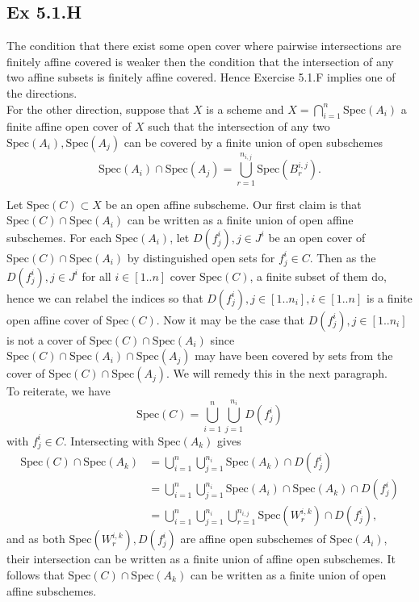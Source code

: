 \documentclass{article}
\theoremstyle{definition}
\newcommand{\Spec}{\text{Spec}}
\begin{document}
\subsection*{Ex 5.1.H}

The condition that there exist some open cover where pairwise intersections are
finitely affine covered is weaker then the condition that the intersection of
any two affine subsets is finitely affine covered. Hence Exercise 5.1.F implies
one of the directions. \\

For the other direction, suppose that $X$ is a scheme and $X = \bigcap_{i =
1}^{n} \Spec(A_i)$ a finite affine open cover of $X$ such that the intersection
of any two $\Spec(A_i), \Spec(A_j)$ can be covered by a finite union of open
subschemes
\[
	\Spec(A_i) \cap \Spec(A_j)
	=
	\bigcup_{r = 1}^{n_{i,j}} \Spec(B_{r}^{i, j}).
\]

Let $\Spec(C) \subset X$ be an open affine subscheme. Our first claim is that
$\Spec(C) \cap \Spec(A_i)$ can be written as a finite union of open affine
subschemes. For each $\Spec(A_i)$, let $D(f_j^i), j \in J^{i}$ be an open cover
of $\Spec(C) \cap \Spec(A_i)$ by distinguished open sets for $f_{j}^{i} \in C$.
Then as the $D(f_j^i), j \in J^{i}$ for all $i \in [1..n]$ cover $\Spec(C)$, a
finite subset of them do, hence we can relabel the indices so that $D(f_j^i), j
\in [1.. n_i], i \in [1..n]$ is a finite open affine cover of $\Spec(C)$. Now
it may be the case that $D(f_j^i), j \in [1.. n_i]$ is not a cover of $\Spec(C)
\cap \Spec(A_i)$ since $\Spec(C) \cap \Spec(A_i) \cap \Spec(A_j)$ may have been
covered by sets from the cover of $\Spec(C) \cap \Spec(A_j)$. We will remedy this 
in the next paragraph. \\

To reiterate, we have 
\[
	\Spec(C) 
	= 
	\bigcup_{i = 1}^{n} 
	\bigcup_{j = 1}^{n_i}
	D(f_j^{i})
\] 
with $f_j^{i} \in C$. Intersecting with $\Spec(A_k)$ gives 
\begin{align*}
	\Spec(C) \cap \Spec(A_k)
	&= 
	\bigcup_{i = 1}^{n} 
	\bigcup_{j = 1}^{n_i}
	\Spec(A_k) \cap D(f_j^{i}) \\
	&= 
	\bigcup_{i = 1}^{n} 
	\bigcup_{j = 1}^{n_i}
	\Spec(A_i) \cap \Spec(A_k) \cap D(f_j^{i}) \\
	&= 
	\bigcup_{i = 1}^{n} 
	\bigcup_{j = 1}^{n_i}
	\bigcup_{r = 1}^{n_{i, j}}
	\Spec(W^{i, k}_{r}) \cap D(f_j^{i}),
\end{align*}
and as both $\Spec(W^{i, k}_{r}), D(f_j^{i})$ are affine open subschemes of
$\Spec(A_i)$, their intersection can be written as a finite union of affine
open subschemes. It follows that $\Spec(C) \cap \Spec(A_k)$ can be written as a
finite union of open affine subschemes. \\
\end{document}
